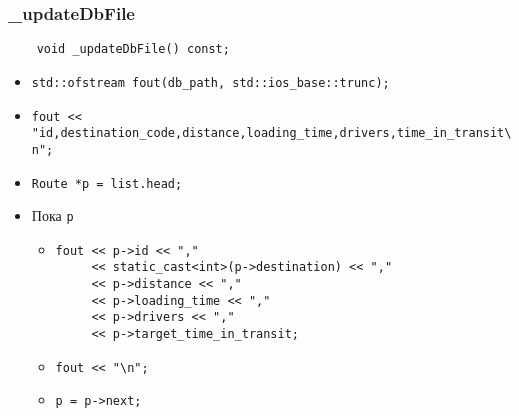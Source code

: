 \subsubsection{\_updateDbFile}

\begin{lstlisting}
    void _updateDbFile() const;
\end{lstlisting}

\begin{itemize}
    \item \verb|std::ofstream fout(db_path, std::ios_base::trunc);|
    \item \verb|fout << "id,destination_code,distance,loading_time,drivers,time_in_transit\n";|
    \item \verb|Route *p = list.head;|
    \item Пока \verb|p|
        \begin{itemize}
            \item 
            \verb|fout << p->id << ","|\\
            \verb|     << static_cast<int>(p->destination) << ","|\\
            \verb|     << p->distance << ","|\\
            \verb|     << p->loading_time << ","|\\
            \verb|     << p->drivers << ","|\\
            \verb|     << p->target_time_in_transit;|
            \item \verb|fout << "\n";|
            \item \verb|p = p->next;|
        \end{itemize}
\end{itemize}

